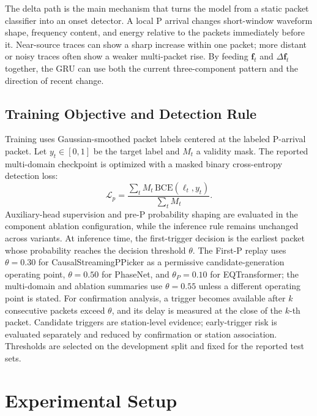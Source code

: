 \documentclass[journal]{IEEEtran}
\newcommand{\modelv}{CausalStreamingPPicker\xspace}
\begin{document}
The delta path is the main mechanism that turns the model from a static packet classifier into an onset detector. A local P arrival changes short-window waveform shape, frequency content, and energy relative to the packets immediately before it. Near-source traces can show a sharp increase within one packet; more distant or noisy traces often show a weaker multi-packet rise. By feeding $\mathbf{f}_t$ and $\Delta\mathbf{f}_t$ together, the GRU can use both the current three-component pattern and the direction of recent change.

\subsection{Training Objective and Detection Rule}
Training uses Gaussian-smoothed packet labels centered at the labeled P-arrival packet. Let $y_t\in[0,1]$ be the target label and $M_t$ a validity mask. The reported multi-domain checkpoint is optimized with a masked binary cross-entropy detection loss:
\begin{equation}
  \mathcal{L}_{p}=
  \frac{\sum_t M_t\,\mathrm{BCE}(\ell_t,y_t)}{\sum_t M_t}.
\end{equation}
Auxiliary-head supervision and pre-P probability shaping are evaluated in the component ablation configuration, while the inference rule remains unchanged across variants. At inference time, the first-trigger decision is the earliest packet whose probability reaches the decision threshold $\theta$. The First-P replay uses $\theta=0.30$ for \modelv{} as a permissive candidate-generation operating point, $\theta=0.50$ for PhaseNet, and $\theta_P=0.10$ for EQTransformer; the multi-domain and ablation summaries use $\theta=0.55$ unless a different operating point is stated. For confirmation analysis, a trigger becomes available after $k$ consecutive packets exceed $\theta$, and its delay is measured at the close of the $k$-th packet. Candidate triggers are station-level evidence; early-trigger risk is evaluated separately and reduced by confirmation or station association. Thresholds are selected on the development split and fixed for the reported test sets.

\section{Experimental Setup}
\end{document}

